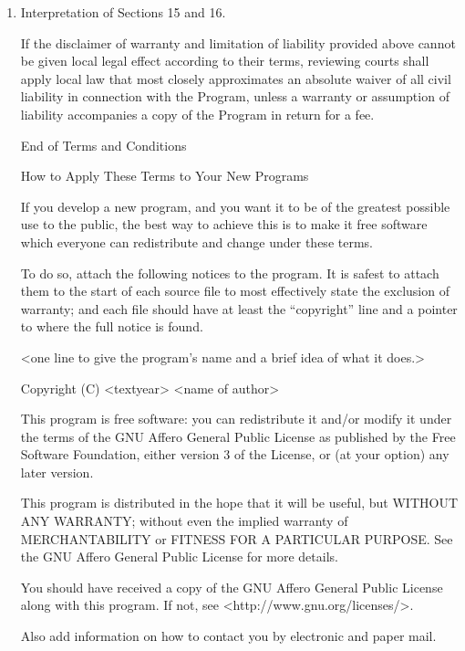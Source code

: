 \documentclass[10pt,a4paper,ngerman,titlepage,tocindentauto]{article}
\begin{document}
\begin{multicols}{3}
{\begin{enumerate}
					\item Interpretation of Sections 15 and 16.

					If the disclaimer of warranty and limitation of liability provided
					above cannot be given local legal effect according to their terms,
					reviewing courts shall apply local law that most closely approximates
					an absolute waiver of all civil liability in connection with the
					Program, unless a warranty or assumption of liability accompanies a
					copy of the Program in return for a fee.

					\begin{center}
					{\sc End of Terms and Conditions}

					\bigskip
					How to Apply These Terms to Your New Programs
					\end{center}

					If you develop a new program, and you want it to be of the greatest
					possible use to the public, the best way to achieve this is to make it
					free software which everyone can redistribute and change under these terms.

					To do so, attach the following notices to the program.  It is safest
					to attach them to the start of each source file to most effectively
					state the exclusion of warranty; and each file should have at least
					the ``copyright'' line and a pointer to where the full notice is found.

					<one line to give the program's name and a brief idea of what it does.>

					Copyright (C) <textyear>  <name of author>

					This program is free software: you can redistribute it and/or modify
					it under the terms of the GNU Affero General Public License as published by
					the Free Software Foundation, either version 3 of the License, or
					(at your option) any later version.

					This program is distributed in the hope that it will be useful,
					but WITHOUT ANY WARRANTY; without even the implied warranty of
					MERCHANTABILITY or FITNESS FOR A PARTICULAR PURPOSE.  See the
					GNU Affero General Public License for more details.

					You should have received a copy of the GNU Affero General Public License
					along with this program.  If not, see <http://www.gnu.org/licenses/>.

					Also add information on how to contact you by electronic and paper mail.


\end{enumerate}}
\end{multicols}
\end{document}
